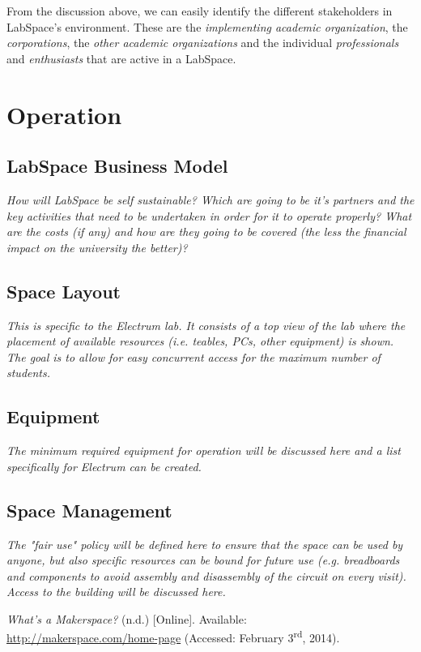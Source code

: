 \documentclass[a4paper, 11pt]{article}
\begin{document}
From the discussion above, we can easily identify the different stakeholders in LabSpace's environment. These are the \textit{implementing academic organization}, the \textit{corporations}, the \textit{other academic organizations} and the individual \textit{professionals} and \textit{enthusiasts} that are active in a LabSpace.


\section{Operation}

\subsection{LabSpace Business Model}
\textit{How will LabSpace be self sustainable? Which are going to be it's partners and the key activities that need to be undertaken in order for it to operate properly? What are the costs (if any) and how are they going to be covered (the less the financial impact on the university the better)?}

\subsection{Space Layout}
\textit{This is specific to the Electrum lab. It consists of a top view of the lab where the placement of available resources (i.e. teables, PCs, other equipment) is shown. The goal is  to allow for  easy concurrent access for the maximum number of students.}

\subsection{Equipment}
\label{sec:equipment}
\textit{The minimum required equipment for operation will be discussed here and a list specifically for Electrum can be created.}

\subsection{Space Management}
\textit{The "fair use" policy will be defined here to ensure that the space can be used by anyone, but also specific resources can be bound for future use (e.g. breadboards and components to avoid assembly and disassembly of the circuit on every visit). Access to the building will be discussed here.}\cite{mobilehealth}

\newpage

\begin{thebibliography}{9}
     \emph{What’s a Makerspace?} (n.d.) [Online]. Available: \\ \href{http://makerspace.com/home-page}{http://makerspace.com/home-page} (Accessed: February 3\textsuperscript{rd}, 2014).
\end{thebibliography}
\end{document}
